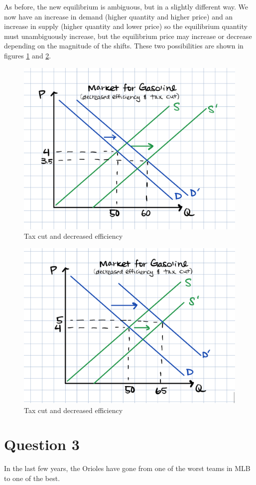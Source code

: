 \documentclass[12pt]{article}
\begin{document}
\begin{enumerate}
As before, the new equilibrium is ambiguous, but in a slightly different way. We now have an increase in demand (higher quantity and higher price) and an increase in supply (higher quantity and lower price) so the equilibrium quantity must unambiguously increase, but the equilibrium price may increase or decrease depending on the magnitude of the shifts. These two possibilities are shown in figures \ref{fig:both_changes_2a} and \ref{fig:both_changes_2b}.

\begin{figure}[H]
    \centering
    \includegraphics[width=.6\textwidth]{both_changes_2a.png}
    \caption{Tax cut and decreased efficiency}
    \label{fig:both_changes_2a}
\end{figure}

\begin{figure}[H]
    \centering
    \includegraphics[width=.6\textwidth]{both_changes_2b.png}
    \caption{Tax cut and decreased efficiency}
    \label{fig:both_changes_2b}
\end{figure}
\end{enumerate}



\section*{Question 3}
In the last few years, the Orioles have gone from one of the worst teams in MLB to one of the best.
\end{document}
